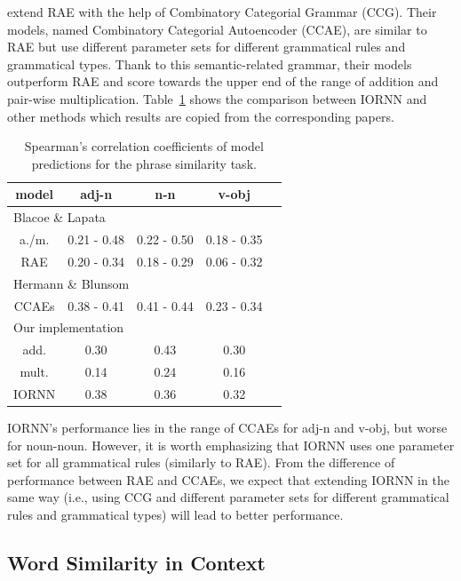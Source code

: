 \documentclass[11pt]{article}
\begin{document}
 extend RAE with the help of Combinatory Categorial Grammar (CCG). 
Their models, named Combinatory Categorial Autoencoder (CCAE), are similar 
to RAE but use different parameter sets for different grammatical rules and grammatical types. 
Thank to this semantic-related grammar, their models outperform RAE and score towards 
the upper end of the range of addition and pair-wise multiplication. Table~\ref{table hermann}
shows the comparison between IORNN and other methods which results are copied from 
the corresponding papers. 

\begin{table}[h!]
	\center
	\begin{tabular}{ccccc}
		\hline
		model & adj-n & n-n & v-obj \\ \hline \hline
		
		\multicolumn{4}{l}{Blacoe \& Lapata} & \\
		a./m. & 0.21 - 0.48 & 0.22 - 0.50 & 0.18 - 0.35 \\ 
		RAE & 0.20 - 0.34 & 0.18 - 0.29 & 0.06 - 0.32 \\ \hline 
		
		\multicolumn{4}{l}{Hermann \& Blunsom} & \\
		CCAEs & 0.38 - 0.41 & 0.41 - 0.44 & 0.23 - 0.34 \\ \hline 
			
		\multicolumn{4}{l}{Our implementation} & \\
		add. & 0.30 & 0.43 & 0.30 \\ 
		mult. & 0.14 & 0.24 & 0.16 \\ 
		IORNN & 0.38 & 0.36 & 0.32 \\ \hline
	\end{tabular}
	\caption{Spearman's correlation coefficients of model predictions for the phrase similarity task.}
	\label{table hermann}
\end{table}

IORNN's performance lies in the range of CCAEs for adj-n and v-obj, 
but worse for noun-noun. However, it is worth emphasizing that IORNN uses one 
parameter set for all grammatical rules (similarly to RAE). 
From the difference of performance between RAE and CCAEs, we expect that extending 
IORNN in the same way (i.e., using CCG and different parameter sets for different 
grammatical rules and grammatical types) will lead to better performance.


\subsection{Word Similarity in Context}
\label{subsection wsc} 
\end{document}
